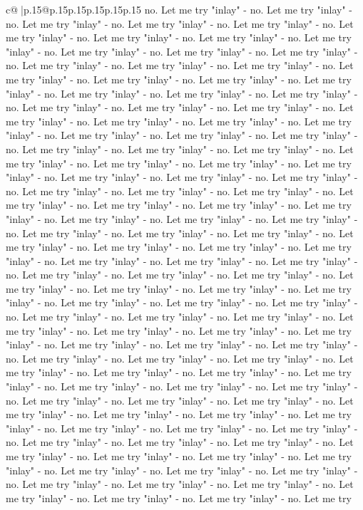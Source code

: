 \documentclass{article}
\begin{document}
{\begin{supertabular}{c@{$\;$}|p{.15\linewidth}@{}p{.15\linewidth}p{.15\linewidth}p{.15\linewidth}p{.15\linewidth}p{.15\linewidth}}
{{{no. Let me try "inlay" {-} no. Let me try "inlay" {-} no. Let me try "inlay" {-} no. Let me try "inlay" {-} no. Let me try "inlay" {-} no. Let me try "inlay" {-} no. Let me try "inlay" {-} no. Let me try "inlay" {-} no. Let me try "inlay" {-} no. Let me try "inlay" {-} no. Let me try "inlay" {-} no. Let me try "inlay" {-} no. Let me try "inlay" {-} no. Let me try "inlay" {-} no. Let me try "inlay" {-} no. Let me try "inlay" {-} no. Let me try "inlay" {-} no. Let me try "inlay" {-} no. Let me try "inlay" {-} no. Let me try "inlay" {-} no. Let me try "inlay" {-} no. Let me try "inlay" {-} no. Let me try "inlay" {-} no. Let me try "inlay" {-} no. Let me try "inlay" {-} no. Let me try "inlay" {-} no. Let me try "inlay" {-} no. Let me try "inlay" {-} no. Let me try "inlay" {-} no. Let me try "inlay" {-} no. Let me try "inlay" {-} no. Let me try "inlay" {-} no. Let me try "inlay" {-} no. Let me try "inlay" {-} no. Let me try "inlay" {-} no. Let me try "inlay" {-} no. Let me try "inlay" {-} no. Let me try "inlay" {-} no. Let me try "inlay" {-} no. Let me try "inlay" {-} no. Let me try "inlay" {-} no. Let me try "inlay" {-} no. Let me try "inlay" {-} no. Let me try "inlay" {-} no. Let me try "inlay" {-} no. Let me try "inlay" {-} no. Let me try "inlay" {-} no. Let me try "inlay" {-} no. Let me try "inlay" {-} no. Let me try "inlay" {-} no. Let me try "inlay" {-} no. Let me try "inlay" {-} no. Let me try "inlay" {-} no. Let me try "inlay" {-} no. Let me try "inlay" {-} no. Let me try "inlay" {-} no. Let me try "inlay" {-} no. Let me try "inlay" {-} no. Let me try "inlay" {-} no. Let me try "inlay" {-} no. Let me try "inlay" {-} no. Let me try "inlay" {-} no. Let me try "inlay" {-} no. Let me try "inlay" {-} no. Let me try "inlay" {-} no. Let me try "inlay" {-} no. Let me try "inlay" {-} no. Let me try "inlay" {-} no. Let me try "inlay" {-} no. Let me try "inlay" {-} no. Let me try "inlay" {-} no. Let me try "inlay" {-} no. Let me try "inlay" {-} no. Let me try "inlay" {-} no. Let me try "inlay" {-} no. Let me try "inlay" {-} no. Let me try "inlay" {-} no. Let me try "inlay" {-} no. Let me try "inlay" {-} no. Let me try "inlay" {-} no. Let me try "inlay" {-} no. Let me try "inlay" {-} no. Let me try "inlay" {-} no. Let me try "inlay" {-} no. Let me try "inlay" {-} no. Let me try "inlay" {-} no. Let me try "inlay" {-} no. Let me try "inlay" {-} no. Let me try "inlay" {-} no. Let me try "inlay" {-} no. Let me try "inlay" {-} no. Let me try "inlay" {-} no. Let me try "inlay" {-} no. Let me try "inlay" {-} no. Let me try "inlay" {-} no. Let me try "inlay" {-} no. Let me try "inlay" {-} no. Let me try "inlay" {-} no. Let me try "inlay" {-} no. Let me try "inlay" {-} no. Let me try "inlay" {-} no. Let me try "inlay" {-} no. Let me try "inlay" {-} no. Let me try "inlay" {-} no. Let me try "inlay" {-} no. Let me try "inlay" {-} no. Let me try "inlay" {-} no. Let me try "inlay" {-} no. Let me try "inlay" {-} no. Let me try "inlay" {-} no. Let me try "inlay" {-} no. Let me try "inlay" {-} no. Let me try "inlay" {-} no. Let me try "inlay" {-} no. Let me try "inlay" {-} no. Let me try "inlay" {-} no. Let me try "inlay" {-} no. Let me try "inlay" {-} no. Let me try }}}
\end{supertabular}}
\end{document}
